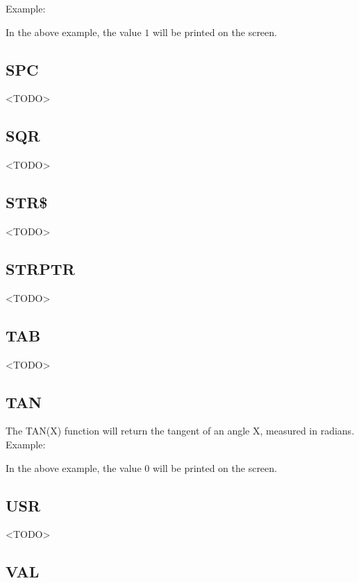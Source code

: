 Example:\\

In the above example, the value $1$ will be printed on the screen.

\subsection{SPC}

<TODO>

\subsection{SQR}

<TODO>

\subsection{STR\$}

<TODO>

\subsection{STRPTR}

<TODO>

\subsection{TAB}

<TODO>

\subsection{TAN}

The {\ttfamily TAN(X)} function will return the tangent of an angle {\ttfamily X}, measured in radians.\\

Example:\\

In the above example, the value $0$ will be printed on the screen.

\subsection{USR}

<TODO>

\subsection{VAL}

